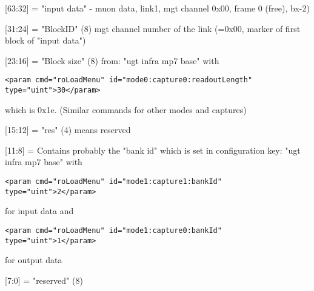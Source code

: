 
[63:32] = "input data" - muon data, link1, mgt channel 0x00, frame 0 (free), bx-2)

[31:24] = "BlockID" (8) mgt channel number of the link (=0x00, marker of first block of "input data")

[23:16] = "Block size" (8) from: "ugt infra mp7 base" with

\texttt{\small{<param cmd="roLoadMenu" id="mode0:capture0:readoutLength" type="uint">30</param>}}

which is 0x1e. (Similar commands for other modes and captures)

[15:12] = "res" (4) means reserved

[11:8] = Contains probably the "bank id" which is set in configuration key: "ugt infra mp7 base" with

\texttt{\small{<param cmd="roLoadMenu" id="mode1:capture1:bankId" type="uint">2</param>}}

for input data and

\texttt{\small{<param cmd="roLoadMenu" id="mode1:capture0:bankId" type="uint">1</param>}}

for output data

[7:0] = "reserved" (8)\\

